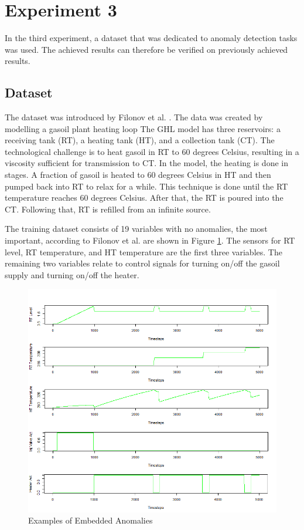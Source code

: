 \section{Experiment 3}
In the third experiment, a dataset that was dedicated to anomaly detection tasks was used. The achieved results can therefore be verified on previously achieved results.

\subsection{Dataset}
The dataset was introduced by Filonov et al. \parencite{Filonov2016}. The data was created by modelling a gasoil plant heating loop The GHL model has three reservoirs: a receiving tank (RT), a heating tank (HT), and a collection tank (CT). The technological challenge is to heat gasoil in RT to 60 degrees Celsius, resulting in a viscosity sufficient for transmission to CT. In the model, the heating is done in stages. A fraction of gasoil is heated to 60 degrees Celsius in HT and then pumped back into RT to relax for a while. This technique is done until the RT temperature reaches 60 degrees Celsius. After that, the RT is poured into the CT. Following that, RT is refilled from an infinite source.

The training dataset consists of 19 variables with no anomalies, the most important, according to Filonov et al. \parencite{Filonov2016} are shown in Figure \ref{fig:GHL_data}. The sensors for RT level, RT temperature, and HT temperature are the first three variables. The remaining two variables relate to control signals for turning on/off the gasoil supply and turning on/off the heater.


\begin{figure}[h]
	\centering
	\includegraphics[scale=0.7]{Figures/GHL_data}
	\decoRule
	\caption[Most important var]{Examples of Embedded Anomalies \parencite{Own}}
	\label{fig:GHL_data}
\end{figure}


